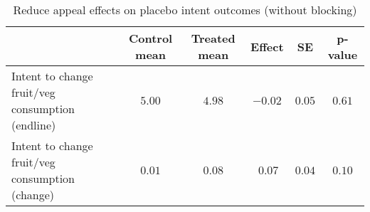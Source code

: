 \begin{table*}[ht]
\caption{Reduce appeal effects on placebo intent outcomes (without blocking)\label{round}} 
\begin{center}
\begin{tabular}{lccccc}
\hline\hline
\multicolumn{1}{l}{}&\multicolumn{1}{c}{Control mean}&\multicolumn{1}{c}{Treated mean}&\multicolumn{1}{c}{Effect}&\multicolumn{1}{c}{SE}&\multicolumn{1}{c}{p-value}\tabularnewline
\hline
Intent to change fruit/veg consumption (endline)&$5.00$&$4.98$&$-0.02$&$0.05$&$0.61$\tabularnewline
Intent to change fruit/veg consumption (change)&$0.01$&$0.08$&$~0.07$&$0.04$&$0.10$\tabularnewline
\hline
\end{tabular}\end{center}

\end{table*}
